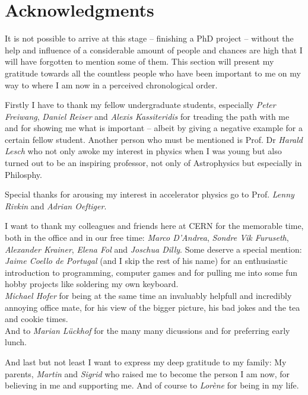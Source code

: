 \section*{Acknowledgments}

It is not possible to arrive at this stage -- finishing a PhD project -- without the help and influence
of a considerable amount of people and chances are high that I will have forgotten to mention some of them.
This section will present my gratitude towards all the countless people who have been important to me
on my way to where I am now in a perceived chronological order.

Firstly I have to thank my fellow undergraduate students, especially \emph{Peter Freiwang}, \emph{Daniel Reiser} and
\emph{Alexis Kassiteridis} for treading the path with me and for showing me what is important
-- albeit by giving a negative example for a certain fellow student. Another person who must be
mentioned is Prof. Dr \emph{Harald Lesch} who not only awoke my interest in physics
when I was young but also turned out to be an inspiring professor, not only of Astrophysics but
especially in Philosphy.

Special thanks for arousing my interest in accelerator physics go to Prof. \emph{Lenny Rivkin} and
\emph{Adrian Oeftiger}.

I want to thank my colleagues and friends here at CERN for the memorable time, both in the office and
in our free time: \emph{Marco D'Andrea}, \emph{Sondre Vik Furuseth},
\emph{Alexander Krainer}, \emph{Elena Fol} and \emph{Joschua Dilly}.
Some deserve a special mention:\\
\emph{Jaime Coello de Portugal} (and I skip the rest of his name) for an enthusiastic introduction
to programming, computer games and for pulling me into some fun hobby projects like soldering my own
keyboard.\\
\emph{Michael Hofer} for being at the same time an invaluably helpfull and incredibly annoying
office mate, for his view of the bigger picture, his bad jokes and the tea and cookie times.\\
And to \emph{Marian Lückhof} for the many many dicussions and for preferring early lunch.

And last but not least I want to express my deep gratitude to my family: My parents, \emph{Martin}
and \emph{Sigrid} who raised me to become the person I am now, for believing in me and supporting me.
And of course to \emph{Lorène} for being in my life.
